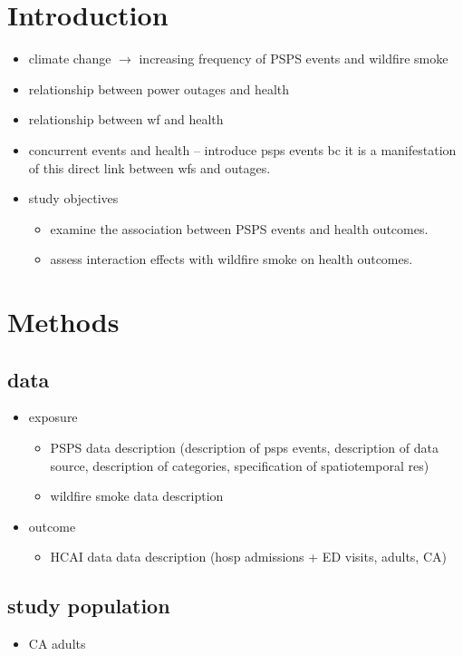 \documentclass[../main.tex]{subfiles}
\begin{document}
\section{Introduction}
\begin{itemize}
    \item climate change $\rightarrow$ increasing frequency of PSPS events and wildfire smoke
    \item relationship between power outages and health
    \item relationship between wf and health 
    \item concurrent events and health -- introduce psps events bc it is a manifestation of this direct link between wfs and outages. 
    \item study objectives
    \begin{itemize}
        \item examine the association between PSPS events and health outcomes.
        \item assess interaction effects with wildfire smoke on health outcomes.
    \end{itemize}
\end{itemize}

\section{Methods}
    \subsection{data}
    \begin{itemize}
        \item exposure 
        \begin{itemize}
          \item PSPS data description (description of psps events, description of data source, description of categories, specification of spatiotemporal res)
          \item wildfire smoke data description
        \end{itemize}
        \item outcome
        \begin{itemize}
          \item HCAI data data description (hosp admissions + ED visits, adults, CA)
        \end{itemize}
    \end{itemize}

    \subsection{study population}
    \begin{itemize}
        \item CA adults
    \end{itemize}
\end{document}
